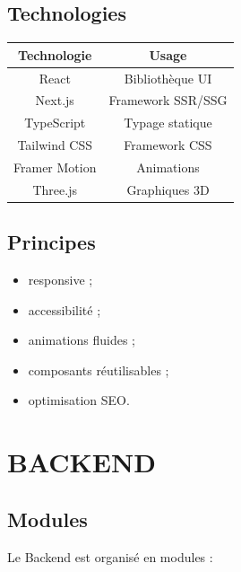 \documentclass[12pt,a4paper,oneside]{book}
\begin{document}
\section{Technologies}
\begin{center}
\begin{tabular}{|c|c|}
\hline
\rowcolor{electronpurple}
\color{white}\textbf{Technologie} & \color{white}\textbf{Usage} \\
\hline
React & Bibliothèque UI \\
\hline
Next.js & Framework SSR/SSG \\
\hline
TypeScript & Typage statique \\
\hline
Tailwind CSS & Framework CSS \\
\hline
Framer Motion & Animations \\
\hline
Three.js & Graphiques 3D \\
\hline
\end{tabular}
\end{center}

\section{Principes}
\begin{itemize}
\item responsive ;
\item accessibilité ;
\item animations fluides ;
\item composants réutilisables ;
\item optimisation SEO.
\end{itemize}

\chapter{BACKEND}

\section{Modules}
Le Backend est organisé en modules :
\end{document}
